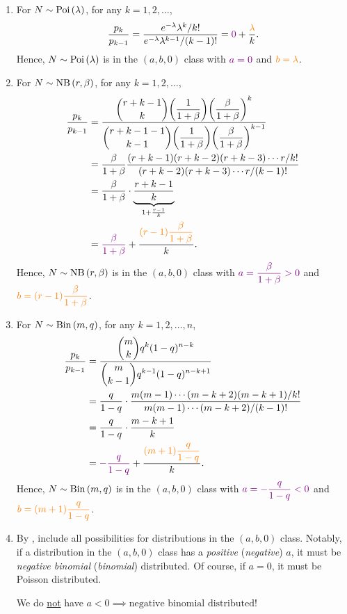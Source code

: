 \begin{enumerate}
\item \label{it:pois-ab0}
For \(N\sim\operatorname{Poi}\left(\lambda\right)\), for any \(k=1,2,\dotsc\),
\[
\frac{p_k}{p_{k-1}}=\frac{e^{-\lambda}\lambda^k/k!}{e^{-\lambda}\lambda^{k-1}/(k-1)!}
={\color{violet}0}+\frac{\color{orange}\lambda}{k}.
\]
Hence, \(N\sim\operatorname{Poi}\left(\lambda\right)\) is in the \((a,b,0)\) class with \(\color{violet}a=0\) and
\(\color{orange}b=\lambda\).

\item \label{it:nb-ab0}
For \(N\sim\operatorname{NB}\left(r,\beta\right)\), for any \(k=1,2,\dotsc\),
\begin{align*}
\frac{p_k}{p_{k-1}}
&=\frac{\displaystyle \binom{r+k-1}{k}\qty(\frac{1}{1+\beta})\qty(\frac{\beta}{1+\beta})^{k}}
{\displaystyle \binom{r+k-1-1}{k-1}\qty(\frac{1}{1+\beta})\qty(\frac{\beta}{1+\beta})^{k-1}}\\
&=\frac{\beta}{1+\beta}\frac{(r+k-1)(r+k-2)(r+k-3)\dotsb r/k!}{(r+k-2)(r+k-3)\dotsb r/(k-1)!}\\
&=\frac{\beta}{1+\beta}\cdot\underbrace{\frac{r+k-1}{k}}_{1+\frac{r-1}{k}}\\
&={\color{violet}\frac{\beta}{1+\beta}}+\frac{\displaystyle {\color{orange}(r-1)\frac{\beta}{1+\beta}}}{k}.
\end{align*}
Hence, \(N\sim\operatorname{NB}\left(r,\beta\right)\) is in the \((a,b,0)\) class with
\(\displaystyle \color{violet}a=\frac{\beta}{1+\beta}>0\) and
\(\displaystyle \color{orange}b=(r-1)\frac{\beta}{1+\beta}\).

\item \label{it:bin-ab0}
For \(N\sim\operatorname{Bin}\left(m,q\right)\), for any \(k=1,2,\dotsc,n\),
\begin{align*}
\frac{p_k}{p_{k-1}}&=\frac{\displaystyle \binom{m}{k}q^k(1-q)^{n-k}}{\displaystyle \binom{m}{k-1}q^{k-1}(1-q)^{n-k+1}}\\
&=\frac{q}{1-q}\cdot\frac{m(m-1)\dotsb(m-k+2)(m-k+1)/k!}{m(m-1)\dotsb(m-k+2)/(k-1)!}\\
&=\frac{q}{1-q}\cdot\frac{m-k+1}{k}\\
&={\color{violet}-\frac{q}{1-q}}+\frac{\displaystyle \color{orange}(m+1)\frac{q}{1-q}}{k}.
\end{align*}
Hence, \(N\sim\operatorname{Bin}\left(m,q\right)\) is in the \((a,b,0)\) class with
\(\displaystyle \color{violet}a=-\frac{q}{1-q}<0\) and
\(\displaystyle \color{orange}b=(m+1)\frac{q}{1-q}\).
\item By , 
include all possibilities for distributions in the \((a,b,0)\) class. Notably,
if a distribution in the \((a,b,0)\) class has a \emph{positive}
(\emph{negative}) \(a\), it must be \emph{negative binomial} (\emph{binomial})
distributed. Of course, if \(a=0\), it must be Poisson distributed.
\begin{warning}
We do \underline{not} have \(a<0\implies\text{negative binomial distributed}\)!
\end{warning}


\end{enumerate}
